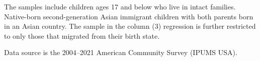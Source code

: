 \documentclass[12pt,english]{article}
\providecommand{\DIFaddtex}[1]{{\protect\color{blue}\uwave{#1}}} %
\providecommand{\DIFaddend}{} %
\providecommand{\DIFaddFL}[1]{\DIFadd{#1}} %
\providecommand{\DIFadd}[1]{\texorpdfstring{\DIFaddtex{#1}}{#1}} %
\DeclareRobustCommand{\DIFaddend}{\DIFOaddend \let\includegraphics\DIFOincludegraphics} %
\begin{document}
\begin{table}[H]
{\begin{threeparttable}
\begin{tablenotes}
\item[\DIFaddFL{2}] \footnotesize{The samples include children ages 17 and below who live in intact families. 
                      Native-born second-generation Asian immigrant children with both
                      parents born in an Asian country. The sample in the column (3) regression is further restricted to only those that migrated from their birth state.}
\item[\DIFaddFL{3}] \footnotesize{Data source is the 2004--2021 American Community Survey (IPUMS USA).}
\end{tablenotes}
\end{threeparttable}}
\end{table}
\DIFaddend 


\pagebreak
\newpage

\end{document}
